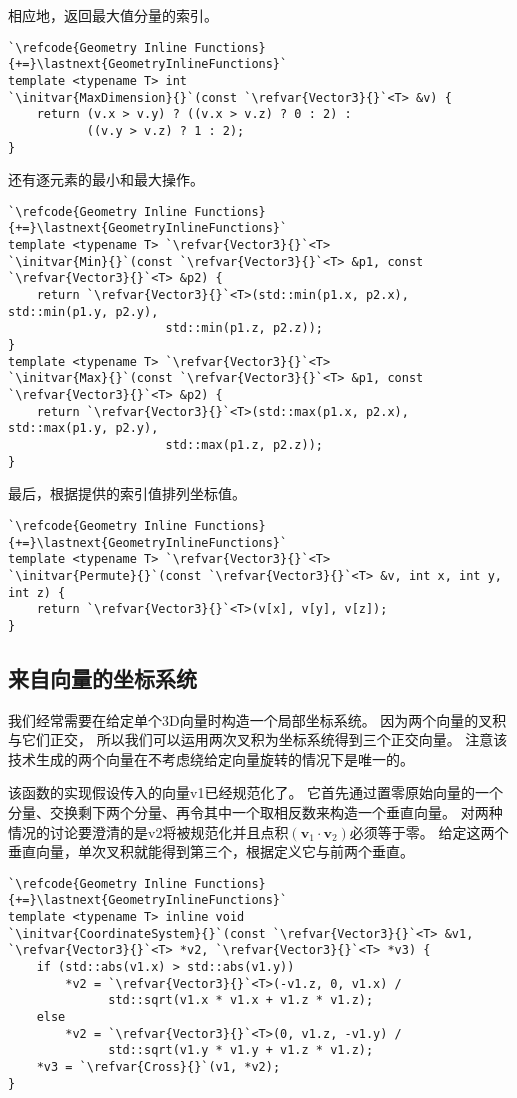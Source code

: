 相应地，返回最大值分量的索引。
\begin{lstlisting}
`\refcode{Geometry Inline Functions}{+=}\lastnext{GeometryInlineFunctions}`
template <typename T> int
`\initvar{MaxDimension}{}`(const `\refvar{Vector3}{}`<T> &v) {
    return (v.x > v.y) ? ((v.x > v.z) ? 0 : 2) : 
           ((v.y > v.z) ? 1 : 2);
}
\end{lstlisting}

还有逐元素的最小和最大操作。
\begin{lstlisting}
`\refcode{Geometry Inline Functions}{+=}\lastnext{GeometryInlineFunctions}`
template <typename T> `\refvar{Vector3}{}`<T>
`\initvar{Min}{}`(const `\refvar{Vector3}{}`<T> &p1, const `\refvar{Vector3}{}`<T> &p2) {
    return `\refvar{Vector3}{}`<T>(std::min(p1.x, p2.x), std::min(p1.y, p2.y), 
                      std::min(p1.z, p2.z));
}
template <typename T> `\refvar{Vector3}{}`<T>
`\initvar{Max}{}`(const `\refvar{Vector3}{}`<T> &p1, const `\refvar{Vector3}{}`<T> &p2) {
    return `\refvar{Vector3}{}`<T>(std::max(p1.x, p2.x), std::max(p1.y, p2.y), 
                      std::max(p1.z, p2.z));
}
\end{lstlisting}

最后，根据提供的索引值排列坐标值。
\begin{lstlisting}
`\refcode{Geometry Inline Functions}{+=}\lastnext{GeometryInlineFunctions}`
template <typename T> `\refvar{Vector3}{}`<T>
`\initvar{Permute}{}`(const `\refvar{Vector3}{}`<T> &v, int x, int y, int z) {
    return `\refvar{Vector3}{}`<T>(v[x], v[y], v[z]);
}
\end{lstlisting}

\subsection{来自向量的坐标系统}\label{sub:来自向量的坐标系统}
我们经常需要在给定单个3D向量时构造一个局部坐标系统。
因为两个向量的叉积与它们正交，
所以我们可以运用两次叉积为坐标系统得到三个正交向量。
注意该技术生成的两个向量在不考虑绕给定向量旋转的情况下是唯一的。

该函数的实现假设传入的向量{\ttfamily v1}已经规范化了。
它首先通过置零原始向量的一个分量、交换剩下两个分量、再令其中一个取相反数来构造一个垂直向量。
对两种情况的讨论要澄清的是{\ttfamily v2}将被规范化并且点积$(\bm v_1\cdot\bm v_2)$必须等于零。
给定这两个垂直向量，单次叉积就能得到第三个，根据定义它与前两个垂直。
\begin{lstlisting}
`\refcode{Geometry Inline Functions}{+=}\lastnext{GeometryInlineFunctions}`
template <typename T> inline void
`\initvar{CoordinateSystem}{}`(const `\refvar{Vector3}{}`<T> &v1, `\refvar{Vector3}{}`<T> *v2, `\refvar{Vector3}{}`<T> *v3) {
    if (std::abs(v1.x) > std::abs(v1.y))
        *v2 = `\refvar{Vector3}{}`<T>(-v1.z, 0, v1.x) /
              std::sqrt(v1.x * v1.x + v1.z * v1.z);
    else
        *v2 = `\refvar{Vector3}{}`<T>(0, v1.z, -v1.y) /
              std::sqrt(v1.y * v1.y + v1.z * v1.z);
    *v3 = `\refvar{Cross}{}`(v1, *v2);
}
\end{lstlisting}